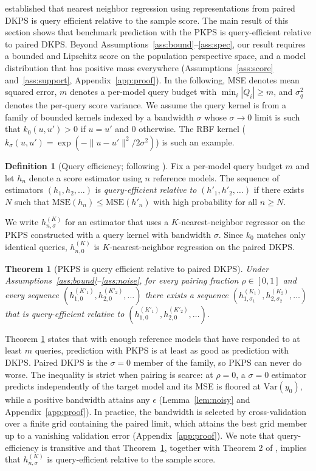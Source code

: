 \documentclass{article}
\newtheorem{theorem}{Theorem}
\theoremstyle{definition}
\newtheorem{definition}{Definition}
\theoremstyle{plain}
\newcommand{\PKPS}{PKPS\xspace}
\begin{document}
\citet{dkps_qeff} established that nearest neighbor regression using representations
from paired DKPS is query efficient relative to the sample score.
The main result of this section shows that benchmark prediction with the \PKPS is
query-efficient relative to paired DKPS.
Beyond Assumptions~\ref{ass:bound}--\ref{ass:spec}, our result requires a bounded
and Lipschitz score on the population perspective space, and a model
distribution that has positive mass everywhere (Assumptions~\ref{ass:score} and~\ref{ass:support},
Appendix~\ref{app:proof}).
In the following, MSE denotes mean squared error,
$m$ denotes a per-model query budget with $\min_{i}|Q_{i}|\ge m$, and $\sigma_q^2$
denotes the per-query score variance.
We assume the query kernel is from a family
of bounded kernels indexed by a bandwidth $\sigma$ whose
$\sigma\to0$ limit is such that $ k_{0}(u, u') > 0 $ if $ u = u' $ and $ 0 $ otherwise. The RBF kernel ($k_{\sigma}(u,u')=\exp(-\|u-u'\|^{2}/2\sigma^{2})$) is
such an example.

\begin{definition}[Query efficiency; following \citealp{dkps_qeff}]
\label{def:qeff}
Fix a per-model query budget $m$ and let $h_n$ denote a score estimator using $n$ reference models.
The sequence of estimators $(h_{1}, h_{2}, \hdots)$ is \emph{query-efficient relative to} $(h'_{1}, h'_{2}, \hdots )$ if there exists $N$ such that
$\mathrm{MSE}(h_n)\le\mathrm{MSE}(h'_n)$ with high probability for all $n\ge N$.
\end{definition}
We write $h_{n,\sigma}^{(K)}$ for an estimator that uses a $K$-nearest-neighbor
regressor on the \PKPS constructed with a query kernel with bandwidth $\sigma$.
Since $k_{0}$ matches only identical queries, $h_{n,0}^{(K)}$ is $K$-nearest-neighbor
regression on the paired DKPS.
\begin{theorem}[\PKPS is query efficient relative to paired DKPS]
\label{thm:qeff}
Under Assumptions~\ref{ass:bound}--\ref{ass:noise}, for every pairing fraction
$\rho\in[0,1]$ and every sequence
$(h_{1,0}^{(K'_{1})}, h_{2,0}^{(K'_{2})}, \hdots)$ there exists a sequence
$(h_{1,\sigma_{1}}^{(K_{1})}, h_{2,\sigma_{2}}^{(K_{2})}, \hdots)$ that is query-efficient relative to
$(h_{1,0}^{(K'_{1})}, h_{2,0}^{(K'_{2})}, \hdots)$.
\end{theorem}

Theorem \ref{thm:qeff} states that with enough reference models that have responded to at least $ m $ queries, prediction with \PKPS is at least as good as prediction with DKPS.
Paired DKPS is the $\sigma=0$ member of the family, so \PKPS can never do worse.
The inequality is strict when pairing is scarce: at
$\rho=0$, a $\sigma=0$ estimator predicts independently of the target model and its MSE
is floored at $\mathrm{Var}(y_{0})$, while a positive bandwidth attains any $\epsilon$
(Lemma~\ref{lem:noisy} and Appendix~\ref{app:proof}).
In practice, the bandwidth is selected by cross-validation over a finite grid containing
the paired limit, which attains the best grid member up to a vanishing validation error
(Appendix~\ref{app:proof}).
We note that query-efficiency is transitive and that Theorem~\ref{thm:qeff}, together with
Theorem 2 of \citet{dkps_qeff}, implies that $ h_{n,\sigma}^{(K)} $ is query-efficient relative to the sample score.
\end{document}
